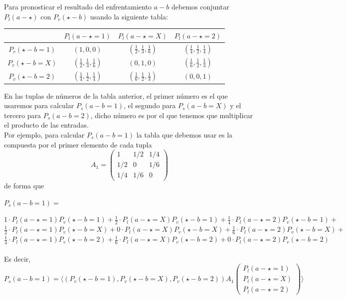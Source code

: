 \newpage

Para pronosticar el resultado del enfrentamiento $a-b$ debemos conjuntar $P_{l}(a - \star)$ con $P_{v}(\star - b)$ usando la siguiente tabla:\\

\begin{center}
	\begin{tabular}{|c|c|c|c|}
	\hline  & $P_{l}(a - \star=1)$ & $P_{l}(a - \star=X)$ & $P_{l}(a - \star=2)$ \\ 
	\hline $P_{v}(\star - b=1)$ & $(1,0,0)$ & $(\frac{1}{2},\frac{1}{3},\frac{1}{6})$ & $(\frac{1}{4},\frac{1}{2},\frac{1}{4})$  \\ 
	\hline $P_{v}(\star - b=X)$ & $(\frac{1}{2},\frac{1}{3},\frac{1}{6})$ & $(0,1,0)$ & $(\frac{1}{6},\frac{1}{2},\frac{1}{3})$ \\ 
	\hline $P_{v}(\star - b=2)$ & $(\frac{1}{4},\frac{1}{2},\frac{1}{4})$ & $(\frac{1}{6},\frac{1}{2},\frac{1}{3})$ & $(0,0,1)$ \\ 
	\hline 
\end{tabular} 
\end{center}

En las tuplas de números de la tabla anterior, el primer número es el que usaremos para calcular $P_{s}(a-b=1)$, el segundo para $P_{s}(a-b=X)$ y el tercero para $P_{s}(a-b=2)$, dicho número es por el que tenemos que multiplicar el producto de las entradas.\\

Por ejemplo, para calcular $P_{s}(a-b=1)$ la tabla que debemos usar es la compuesta por el primer elemento de cada tupla\\
\[
A_{1}= \left(\begin{array}{ccc}
1 & 1/2 & 1/4\\
1/2 & 0 & 1/6\\
1/4 & 1/6 & 0
\end{array} \right)
\]
de forma que
	\begin{center}
		$P_{s}(a-b=1)=$
	\end{center}
	$1\cdotp P_{l}(a - \star=1)P_{v}(\star - b=1) + \frac{1}{2}\cdotp P_{l}(a - \star=X)P_{v}(\star - b=1) + \frac{1}{4}\cdotp P_{l}(a - \star=2)P_{v}(\star - b=1)+$\\ 
	$\frac{1}{2}\cdotp P_{l}(a - \star=1)P_{v}(\star - b=X) + 0\cdotp P_{l}(a - \star=X)P_{v}(\star - b=X) + \frac{1}{6}\cdotp P_{l}(a - \star=2)P_{v}(\star - b=X)+$\\
	$\frac{1}{4}\cdotp P_{l}(a - \star=1)P_{v}(\star - b=2) + \frac{1}{6}\cdotp P_{l}(a - \star=X)P_{v}(\star - b=2) + 0\cdotp P_{l}(a - \star=2)P_{v}(\star - b=2)$ \\
\ \\	
Es decir, $P_{s}(a-b=1)= 
\langle
(P_{v}(\star - b=1),P_{v}(\star - b=X),P_{v}(\star - b=2)) A_{1}  
\left(\begin{array}{c}
P_{l}(a - \star=1)\\
P_{l}(a - \star=X)\\
P_{l}(a - \star=2)
\end{array} \right)
\rangle $\\

